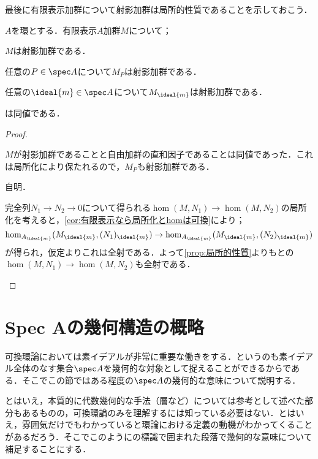 最後に有限表示加群について射影加群は局所的性質であることを示しておこう．

\begin{prop}\label{prop:射影加群は局所的}
	$A$を環とする．有限表示$A$加群$M$について；
	\begin{sakura}
		\item $M$は射影加群である．
		\item 任意の$P\in\spec A$について$M_P$は射影加群である．
		\item 任意の${\ideal{m}}\in\spec A$について$M_{{\ideal{m}}}$は射影加群である．
	\end{sakura}
	は同値である．
\end{prop}

\begin{proof}
	\begin{eqv}[3]
		\item $M$が射影加群であることと自由加群の直和因子であることは同値であった．これは局所化により保たれるので，$M_P$も射影加群である．
		\item 
		自明．
		\item 完全列$N_1\to N_2\to 0$について得られる$\hom(M,N_1)\to\hom(M,N_2)$の局所化を考えると，\ref{cor:有限表示なら局所化とhomは可換}により；
		\[\hom_{A_{\ideal{m}}}(M_{\ideal{m}},(N_1)_{\ideal{m}})\to\hom_{A_{\ideal{m}}}(M_{\ideal{m}},(N_2)_{\ideal{m}})\]
		が得られ，仮定よりこれは全射である．よって\ref{prop:局所的性質}よりもとの$\hom(M,N_1)\to\hom(M,N_2)$も全射である．
	\end{eqv}
\end{proof}

\section{Spec Aの幾何構造の概略}\label{sec:spec A}

可換環論においては素イデアルが非常に重要な働きをする．というのも素イデアル全体のなす集合$\spec A$を幾何的な対象として捉えることができるからである．そこでこの節ではある程度の$\spec A$の幾何的な意味について説明する．

\begin{tightcurve}
	とはいえ，本質的に代数幾何的な手法（層など）については参考として述べた部分もあるものの，可換環論のみを理解するには知っている必要はない．とはいえ，雰囲気だけでもわかっていると環論における定義の動機がわかってくることがあるだろう．そこでこのようにの標識で囲まれた段落で幾何的な意味について補足することにする．
\end{tightcurve}

